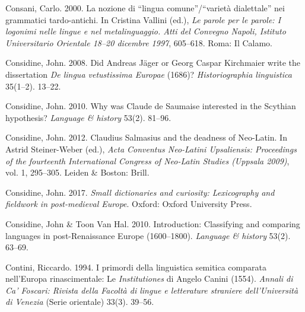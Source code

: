 \begin{styleStandard}
Consani, Carlo. 2000. La nozione di “lingua comune”/“varietà dialettale” nei grammatici tardo-antichi. In Cristina Vallini (ed.), \textit{Le parole per le parole: I logonimi nelle lingue e nel metalinguaggio. Atti del Convegno Napoli, Istituto Universitario Orientale 18–20 dicembre 1997}, 605–618. Roma: Il Calamo.
\end{styleStandard}

\begin{styleStandard}
Considine, John. 2008. Did Andreas Jäger or Georg Caspar Kirchmaier write the dissertation \textit{De lingua vetustissima Europae} (1686)? \textit{Historiographia linguistica} 35(1–2). 13–22.
\end{styleStandard}

\begin{styleStandard}
Considine, John. 2010. Why was Claude de Saumaise interested in the Scythian hypothesis? \textit{Language \& history} 53(2). 81–96.
\end{styleStandard}

\begin{styleStandard}
Considine, John. 2012. Claudius Salmasius and the deadness of Neo-Latin. In Astrid Steiner-Weber (ed.), \textit{Acta Conventus Neo-Latini Upsaliensis: Proceedings of the fourteenth International Congress of Neo-Latin Studies (Uppsala 2009)}, vol. 1, 295–305. Leiden \& Boston: Brill.
\end{styleStandard}

\begin{styleStandard}
Considine, John. 2017. \textit{Small dictionaries and curiosity: Lexicography and fieldwork in post-medieval Europe}. Oxford: Oxford University Press.
\end{styleStandard}

\begin{styleStandard}
Considine, John \& Toon Van Hal. 2010. Introduction: Classifying and comparing languages in post-Renaissance Europe (1600–1800). \textit{Language \& history} 53(2). 63–69.
\end{styleStandard}

\begin{styleStandard}
Contini, Riccardo. 1994. I primordi della linguistica semitica comparata nell’Europa rinascimentale: Le \textit{Institutiones} di Angelo Canini (1554). \textit{Annali di Ca’ Foscari: Rivista della Facoltà di lingue e letterature straniere dell’Università di Venezia} (Serie orientale) 33(3). 39–56.
\end{styleStandard}

